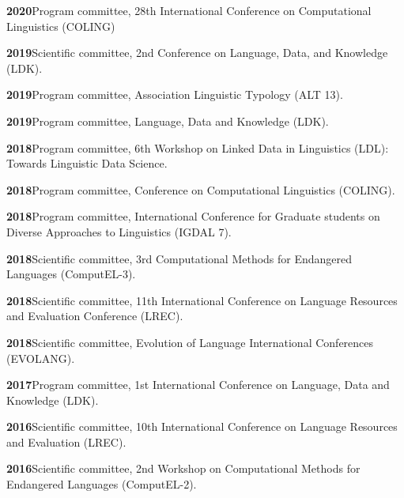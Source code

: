 \documentclass[11pt]{article}
\newcommand{\hangpara}{
 \setlength{\parindent}{0in} %
 \hangindent=0.42in %
}
\begin{document}
\vskip 6pt
\hangpara
{\bf 2020}\hspace{1ex}Program committee, 28th International Conference on Computational Linguistics (COLING)

\vskip 6pt
\hangpara
{\bf 2019}\hspace{1ex}Scientific committee, 2nd Conference on Language, Data, and Knowledge (LDK).

\vskip 6pt
\hangpara
{\bf 2019}\hspace{1ex}Program committee, Association Linguistic Typology (ALT 13).

\vskip 6pt
\hangpara
{\bf 2019}\hspace{1ex}Program committee, Language, Data and Knowledge (LDK).

\vskip 6pt
\hangpara
{\bf 2018}\hspace{1ex}Program committee, 6th Workshop on Linked Data in Linguistics (LDL): Towards Linguistic Data Science.

\vskip 6pt
\hangpara
{\bf 2018}\hspace{1ex}Program committee, Conference on Computational Linguistics (COLING).

\vskip 6pt
\hangpara
{\bf 2018}\hspace{1ex}Program committee, International Conference for Graduate students on Diverse Approaches to Linguistics (IGDAL 7).

\vskip 6pt
\hangpara
{\bf 2018}\hspace{1ex}Scientific committee, 3rd Computational Methods for Endangered Languages (ComputEL-3).

\vskip 6pt
\hangpara
{\bf 2018}\hspace{1ex}Scientific committee, 11th International Conference on Language Resources and Evaluation Conference (LREC).

\vskip 6pt
\hangpara
{\bf 2018}\hspace{1ex}Scientific committee, Evolution of Language International Conferences (EVOLANG).

\vskip 6pt
\hangpara
{\bf 2017}\hspace{1ex}Program committee, 1st International Conference on Language, Data and Knowledge (LDK).

\vskip 6pt
\hangpara
{\bf 2016}\hspace{1ex}Scientific committee, 10th International Conference on Language Resources and Evaluation (LREC).

\vskip 6pt
\hangpara
{\bf 2016}\hspace{1ex}Scientific committee, 2nd Workshop on Computational Methods for Endangered Languages (ComputEL-2).
\end{document}

